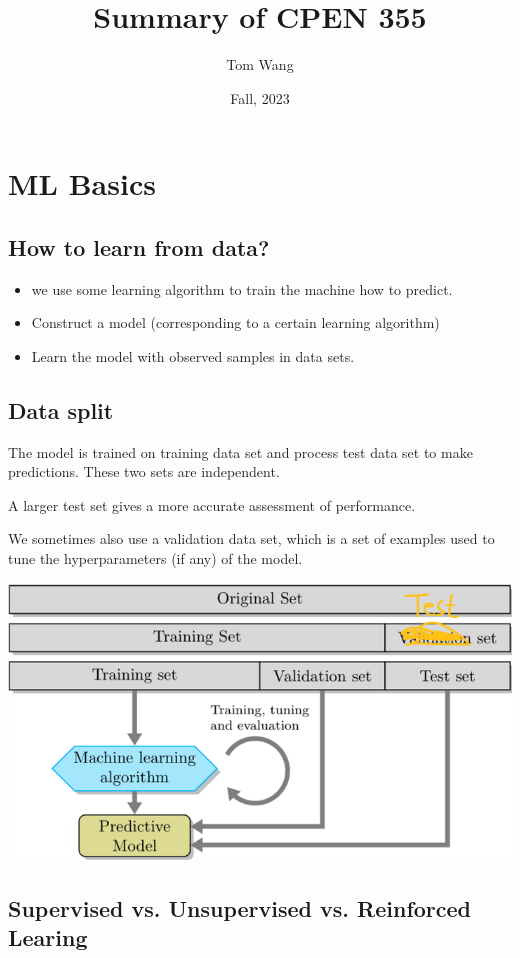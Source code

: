 \documentclass[letterpaper,12pt]{article}
\title{Summary of CPEN 355}
\author{Tom Wang}
\date{Fall, 2023}
\begin{document}
\maketitle
\thispagestyle{plain}

\section{ML Basics}
\subsection{How to learn from data?}
\begin{itemize}
    \item we use some learning algorithm to train the machine how to predict.
    \item Construct a model (corresponding to a certain learning algorithm)
    \item Learn the model with observed samples in data sets.
\end{itemize}

\subsection{Data split}
The model is trained on training data set and process test data set to make
predictions. These two sets are independent.

A larger test set gives a more accurate assessment of performance.

We sometimes also use a validation data set, which is a set of examples used to
tune the hyperparameters (if any) of the model.

\includegraphics{./Image/Data split.png}

\subsection{Supervised vs. Unsupervised vs. Reinforced Learing}
\end{document}
